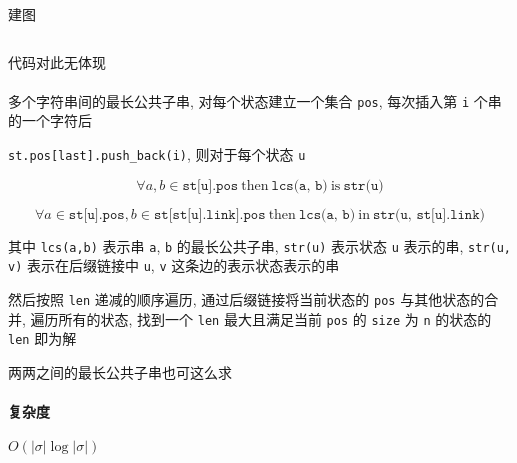 建图
\inputminted{cpp}{src/src/exsam_build.txt}

代码对此无体现\\
\\

多个字符串间的最长公共子串, 对每个状态建立一个集合 \verb|pos|, 每次插入第 \verb|i| 个串的一个字符后

\verb|st.pos[last].push_back(i)|, 则对于每个状态 \verb|u|

\[
    \forall a,b \in \texttt{st[u].pos}~\text{then}~\texttt{lcs(a, b)}~\text{is}~\texttt{str(u)}
\]

\[
    \forall a\in \texttt{st[u].pos}, b\in \texttt{st[st[u].link].pos}~\text{then}~\texttt{lcs(a, b)} ~\text{in}~ \texttt{str(u, st[u].link)}
\]

其中 \verb|lcs(a,b)| 表示串 \verb|a|, \verb|b| 的最长公共子串, \verb|str(u)| 表示状态 \verb|u| 表示的串, \verb|str(u, v)| 表示在后缀链接中 \verb|u|, \verb|v| 这条边的表示状态表示的串

然后按照 \verb|len| 递减的顺序遍历, 通过后缀链接将当前状态的 \verb|pos| 与其他状态的合并, 遍历所有的状态, 找到一个 \verb|len| 最大且满足当前 \verb|pos| 的 \verb|size| 为 \verb|n| 的状态的 \verb|len| 即为解

两两之间的最长公共子串也可这么求

\paragraph{复杂度}

\(O(|\sigma| \log|\sigma|)\)
